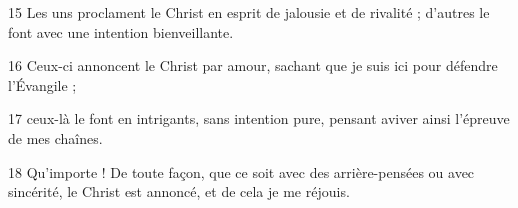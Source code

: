 
15 Les uns proclament le Christ en esprit de jalousie et de rivalité ; d’autres le font avec une intention bienveillante.

16 Ceux-ci annoncent le Christ par amour, sachant que je suis ici pour défendre l’Évangile ;

17 ceux-là le font en intrigants, sans intention pure, pensant aviver ainsi l’épreuve de mes chaînes.

18 Qu’importe ! De toute façon, que ce soit avec des arrière-pensées ou avec sincérité, le Christ est annoncé, et de cela je me réjouis.